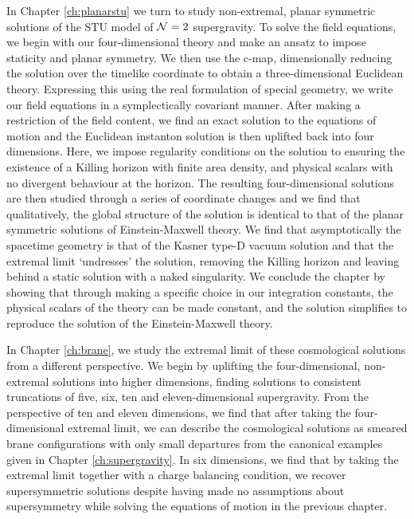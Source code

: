 In Chapter \ref{ch:planarstu} we turn to study non-extremal, planar symmetric solutions of the STU model of ${\cal N} = 2$ supergravity. To solve the field equations, we begin with our four-dimensional theory and make an ansatz to impose staticity and planar symmetry. We then use the c-map, dimensionally reducing the solution over the timelike coordinate to obtain a three-dimensional Euclidean theory. Expressing this using the real formulation of special geometry, we write our field equations in a symplectically covariant manner. After making a restriction of the field content, we find an exact solution to the equations of motion and the Euclidean instanton solution is then uplifted back into four dimensions. Here, we impose regularity conditions on the solution to ensuring the existence of a Killing horizon with finite area density, and physical scalars with no divergent behaviour at the horizon. The resulting four-dimensional solutions are then studied through a series of coordinate changes and we find that qualitatively, the global structure of the solution is identical to that of the planar symmetric solutions of Einstein-Maxwell theory. We find that asymptotically the spacetime geometry is that of the Kasner type-D vacuum solution and that the extremal limit `undresses' the solution, removing the Killing horizon and leaving behind a static solution with a naked singularity. We conclude the chapter by showing that through making a specific choice in our integration constants, the physical scalars of the theory can be made constant, and the solution simplifies to reproduce the solution of the Einstein-Maxwell theory.

In Chapter \ref{ch:brane}, we study the extremal limit of these cosmological solutions from a different perspective. We begin by uplifting the four-dimensional, non-extremal solutions into higher dimensions, finding solutions to consistent truncations of five, six, ten and eleven-dimensional supergravity. From the perspective of ten and eleven dimensions, we find that after taking the four-dimensional extremal limit, we can describe the cosmological solutions as smeared brane configurations with only small departures from the canonical examples given in Chapter \ref{ch:supergravity}. In six dimensions, we find that by taking the extremal limit together with a charge balancing condition, we recover supersymmetric solutions despite having made no assumptions about supersymmetry while solving the equations of motion in the previous chapter.

